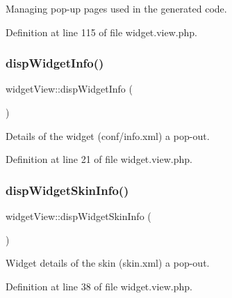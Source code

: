 Managing pop-\/up pages used in the generated code. 



Definition at line 115 of file widget.\+view.\+php.

\mbox{\label{classwidgetView_aa0744579c05eacb742561abbc967c720}} 
\subsubsection{\texorpdfstring{disp\+Widget\+Info()}{dispWidgetInfo()}}
{\footnotesize\ttfamily widget\+View\+::disp\+Widget\+Info (\begin{DoxyParamCaption}{ }\end{DoxyParamCaption})}



Details of the widget (conf/info.\+xml) a pop-\/out. 



Definition at line 21 of file widget.\+view.\+php.

\mbox{\label{classwidgetView_a7d7203cb8a9ddec4628beb6ae1f55ff5}} 
\subsubsection{\texorpdfstring{disp\+Widget\+Skin\+Info()}{dispWidgetSkinInfo()}}
{\footnotesize\ttfamily widget\+View\+::disp\+Widget\+Skin\+Info (\begin{DoxyParamCaption}{ }\end{DoxyParamCaption})}



Widget details of the skin (skin.\+xml) a pop-\/out. 



Definition at line 38 of file widget.\+view.\+php.

\mbox{\label{classwidgetView_a0bc95329be4497bd1b8dbb7702b51e2c}} 
